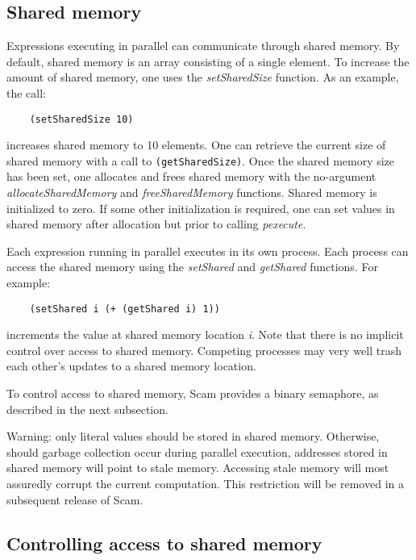 \subsection{Shared memory}

Expressions executing in parallel can communicate through shared memory.
By default, shared memory is an array consisting of a single element.
To increase the amount of shared memory, one uses the {\it setSharedSize}
function.
As an example, the call:

\begin{verbatim}
    (setSharedSize 10)
\end{verbatim}

increases shared memory to 10 elements. One can retrieve the current size of
shared memory with a call to \verb!(getSharedSize)!.
Once the shared memory size has been set, one allocates and frees
shared memory with the no-argument {\it allocateSharedMemory}
and {\it freeSharedMemory}
functions.
Shared memory is initialized to zero. If some other initialization is
required, one can set values in shared memory after allocation but prior
to calling {\it pexecute}.

Each expression running in parallel executes in its own
process. Each process
can access the shared memory using the {\it setShared} and {\it getShared}
functions.  For example:

\begin{verbatim}
    (setShared i (+ (getShared i) 1))
\end{verbatim}

increments the value at shared memory location {\it i}. Note that there
is no implicit control over access to shared memory. Competing processes
may very well trash each other's updates to a shared memory location.

To control access to shared memory,
Scam provides a binary semaphore, as described
in the next subsection.

\color{red}
Warning:
\color{black}
only literal values should be stored in shared memory.
Otherwise, should garbage collection occur during parallel execution,
addresses stored in shared memory will point to stale memory.
Accessing stale memory
will most assuredly corrupt the current computation.
This restriction will be removed in a subsequent release of Scam.

\subsection{Controlling access to shared memory}

